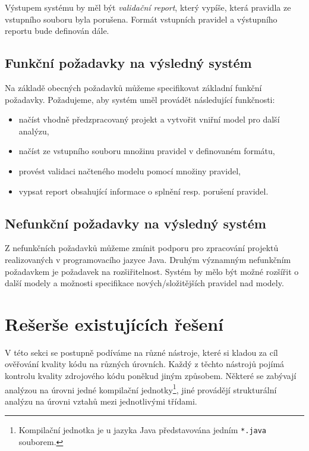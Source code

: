 Výstupem systému by měl být \emph{validační report}, který vypíše, která pravidla ze vstupního souboru byla porušena. Formát vstupních pravidel a výstupního reportu bude definován dále.

\subsection{Funkční požadavky na výsledný systém}

Na základě obecných požadavků můžeme specifikovat základní funkční požadavky. Požadujeme, aby systém uměl provádět následující funkčnosti:
\begin{itemize}
\item načíst vhodně předzpracovaný projekt a vytvořit vniřní model pro další analýzu,
\item načíst ze vstupního souboru množinu pravidel v definovaném formátu,
\item provést validaci načteného modelu pomocí množiny pravidel,
\item vypsat report obsahující informace o splnění resp. porušení pravidel.
\end{itemize}

\subsection{Nefunkční požadavky na výsledný systém}
Z nefunkčních požadavků můžeme zmínit podporu pro zpracování projektů realizovaných v programovacího jazyce Java. Druhým významným nefunkčním požadavkem je požadavek na rozšiřitelnost. Systém by mělo být možné rozšířit o další modely a možnosti specifikace nových/složitějších pravidel nad modely.

\section{Rešerše existujících řešení}
\label{requirements-existing_tools}

V této sekci se postupně podíváme na různé nástroje, které si kladou za cíl ověřování kvality kódu na různých úrovních. Každý z těchto nástrojů pojímá kontrolu kvality zdrojového kódu poněkud jiným způsobem. Některé se zabývají  analýzou na úrovni jedné kompilační jednotky\footnote{Kompilační jednotka je u jazyka Java představována jedním \verb-*.java- souborem.}, jiné provádějí strukturální analýzu na úrovni vztahů mezi jednotlivými třídami.

